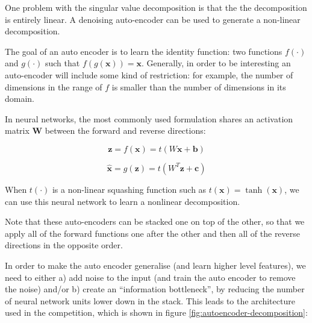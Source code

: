 \documentclass{article}
\begin{document}
One problem with the singular value decomposition is that the the decomposition is entirely linear.  A denoising auto-encoder \cite{Vincent-TR1316} can be used to generate a non-linear decomposition.

The goal of an auto encoder is to learn the identity function: two functions $f(\cdot)$ and $g(\cdot)$ such that $f(g(\mathbf{x})) = \mathbf{x}$.  Generally, in order to be interesting an auto-encoder will include some kind of restriction: for example, the number of dimensions in the range of $f$ is smaller than the number of dimensions in its domain.

In neural networks, the most commonly used formulation shares an activation matrix $\mathbf{W}$ between the forward and reverse directions:

\begin{equation}
\label{eqn:autoencoder-encode}
\mathbf{z} = f(\mathbf{x}) = t(W\mathbf{x} + \mathbf{b})
\end{equation}

\begin{equation}
\label{eqn:autoencoder-decode}
\hat{\mathbf{x}} = g(\mathbf{z}) = t(W^T\mathbf{z} + \mathbf{c})
\end{equation}

When $t(\cdot)$ is a non-linear squashing function such as $t(\mathbf{x}) = \tanh(\mathbf{x})$, we can use this neural network to learn a nonlinear decomposition.

Note that these auto-encoders can be stacked one on top of the other, so that we apply all of the forward functions one after the other and then all of the reverse directions in the opposite order.

In order to make the auto encoder generalise (and learn higher level features), we need to either a) add noise to the input (and train the auto encoder to remove the noise) and/or b) create an ``information bottleneck'', by reducing the number of neural network units lower down in the stack.  This leads to the architecture used in the competition, which is shown in figure \ref{fig:autoencoder-decomposition}:
\end{document}
